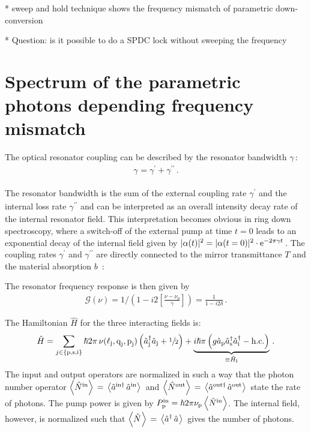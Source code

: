 \documentclass[aps,pra,showpacs,reprint,onecolumn,notitlepage]{revtex4-1}
\makeatletter
\newcommand{\avr}[1]{\mathop{\left\langle #1 \right\rangle}\nolimits}
\newcommand{\tx}[1]{\textnormal{#1}}
\def\@fnsymbol#1{\ensuremath{\ifcase#1\or *\or \dagger\or \ddagger\or
   \mathsection\or \mathparagraph\or \|\or **\or \dagger\dagger
   \or \ddagger\ddagger \else\@ctrerr\fi}}
\newcommand{\ssym}[1]{^{\@fnsymbol{#1}}}
\makeatother
\begin{document}
* sweep and hold technique shows the frequency mismatch of parametric down-conversion

* Question: is it possible to do a SPDC lock without sweeping the frequency

\section{Spectrum of the parametric photons depending frequency mismatch}
The optical resonator coupling can be described by the resonator bandwidth $\gamma\,$:
\begin{align}
	\gamma_\textrm{} = \gamma^{\prime}_\textrm{} + \gamma^{\prime\prime}_\textrm{} \, .
	\label{eq:resbandwidth}
\end{align}

The resonator bandwidth is the sum of the external coupling rate $\gamma^{\prime}_\textrm{}$ and the internal loss rate $\gamma^{\prime\prime}_\textrm{}$ and can be interpreted as an overall intensity decay rate of the internal resonator field. This interpretation becomes obvious in ring down spectroscopy, where a switch-off of the external pump at time $t=0$ leads to an exponential decay of the internal field given by $|\alpha(t)|^2 = |\alpha(t=0)|^2 \cdot \tx{e}^{- 2 \pi \gamma t}\,$. The coupling rates $\gamma^\prime$ and $\gamma^{\prime\prime}$ are directly connected to the mirror transmittance $T$ and the material absorption $b\,$ \cite{Bachor2004}:

The resonator frequency response is then given by
\begin{align}
	\mathcal{G} (\nu) = 1 / \left( 1 - i 2 {\left[ \frac{\nu-\nu_0}{\gamma} \right]}  \right) = \frac{1}{ {1 - i 2 \delta} } \,.
	\label{eq:cavityresponse}
\end{align}

The Hamiltonian $\hat{H}$ for the three interacting fields is:
\begin{align}
	\hat{H} = {\sum_{j \in \left\lbrace \tx{p,s,i} \right\rbrace}{\hslash 2 \pi \, \nu (\ell_\textrm{j},\textrm{q}_\textrm{j},\textrm{p}_\textrm{j}) \left( \hat{a}\ssym{2}_\tx{j} \hat{a}_\tx{j} + \sfrac{1}{2} \right)} }
	+ \underbrace{i \hslash \pi  \left( {g} \hat{a}_\tx{p}  \hat{a}_\tx{s}\ssym{2} \hat{a}_\tx{i}\ssym{2} - \tx{h.c.} \right) }_{ \equiv \hat{H}_\tx{I}} \,.
	\label{eq:HamiltonianPDC}
\end{align}
The input and output operators are normalized in such a way that the photon number operator $\avr{\hat{N}^\tx{in}}\,=\,\avr{{\hat{a}^{\tx{in}\dagger}} \, \hat{a}^\tx{in}}\,$ and $\avr{\hat{N}^\tx{out}}\,=\,\avr{{\hat{a}^{\tx{out}\dagger}} \, \hat{a}^\tx{out}}\,$ state the rate of photons. The pump power is given by $P^\tx{in}_\textrm{p} = \hbar 2 \pi \nu_\tx{p} \avr{\hat{N}^\tx{in}}$. The internal field, however, is normalized such that $\avr{\hat{N}^\tx{}}\,=\,\avr{{\hat{a}^{\tx{}\dagger}} \, \hat{a}^\tx{}}\,$ gives the number of photons.
\end{document}
